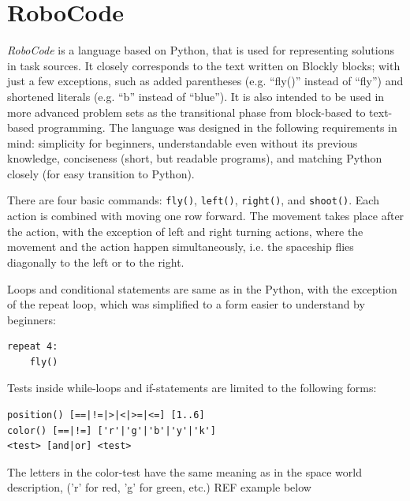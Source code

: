 \section{RoboCode}
\label{sec:robocode}

\emph{RoboCode} is a language based on Python,
that is used for representing solutions in task sources.
It closely corresponds to the text written on Blockly blocks;
with just a few exceptions, such as added parentheses
(e.g. ``fly()'' instead of ``fly'')
and shortened literals (e.g. ``b'' instead of ``blue'').
It is also intended to be used in more advanced problem sets as the
transitional phase from block-based to text-based programming.
The language was designed in the following requirements in mind:
simplicity for beginners, understandable even without its previous knowledge,
conciseness (short, but readable programs),
and matching Python closely (for easy transition to Python).



There are four basic commands: %
\texttt{fly()},
\texttt{left()},
\texttt{right()}, and
\texttt{shoot()}.
Each action is combined with moving one row forward.
The movement takes place after the action, with the exception of left and right turning actions, where the movement and the action happen simultaneously,
i.e. the spaceship flies diagonally to the left or to the right.

Loops and conditional statements are same as in the Python,
with the exception of the repeat loop,
which was simplified to a form
easier to understand by beginners:
\begin{lstlisting}
repeat 4:
    fly()
\end{lstlisting}
Tests inside while-loops and if-statements are limited to the following forms:
\begin{lstlisting}
position() [==|!=|>|<|>=|<=] [1..6]
color() [==|!=] ['r'|'g'|'b'|'y'|'k']
<test> [and|or] <test>
\end{lstlisting}
The letters in the color-test have the same meaning as in the space world description,
('r' for red, 'g' for green, etc.)
REF example below


